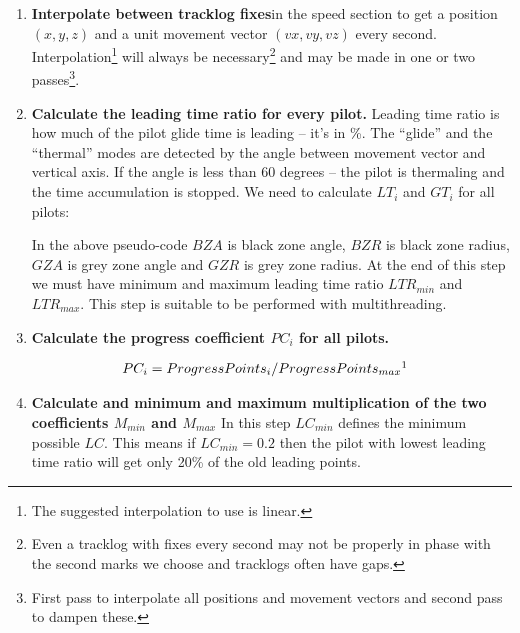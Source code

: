 \documentclass[gap.tex]{subfiles}
\begin{document}
\begin{enumerate}
    \item \textbf{Interpolate between tracklog fixes}\footnotemark in the speed
        section to get a position \((x, y, z)\) and a unit movement vector
        \((vx, vy, vz)\) every second. Interpolation\footnote{The
        suggested interpolation to use is linear.} will always be
        necessary\footnote{Even a tracklog with fixes every second may not be
        properly in phase with the second marks we choose and tracklogs often
        have gaps.} and may be made in one or two passes\footnote{First pass to
        interpolate all positions and movement vectors and second pass to
        dampen these.}.

    \item \textbf{Calculate the leading time ratio for every pilot.} Leading
        time ratio is how much of the pilot glide time is leading – it’s in \%.
        The “glide” and the “thermal” modes are detected by the angle between
        movement vector and vertical axis. If the angle is less than 60 degrees
        – the pilot is thermaling and the time accumulation is stopped. We need
        to calculate \(LT_i\) and \(GT_i\) for all pilots:

        In the above pseudo-code \(BZA\) is black zone angle, \(BZR\) is black
        zone radius, \(GZA\) is grey zone angle and \(GZR\) is grey zone
        radius. At the end of this step we must have minimum and maximum
        leading time ratio \(LTR_{min}\) and \(LTR_{max}\). This step is
        suitable to be performed with multithreading.

    \item \textbf{Calculate the progress coefficient \(PC_i\) for all pilots.}
        
        \begin{align*}
            PC_i &= ProgressPoints_i / ProgressPoints_{max}\footnotemark
        \end{align*}

    \item \textbf{Calculate and minimum and maximum multiplication of the two
        coefficients \(M_{min}\) and \(M_{max}\)} In this step \(LC_{min}\)
        defines the minimum possible \(LC\). This means if \(LC_{min} = 0.2\)
        then the pilot with lowest leading time ratio will get only 20\% of the
        old leading points.
        

\end{enumerate}
\end{document}
